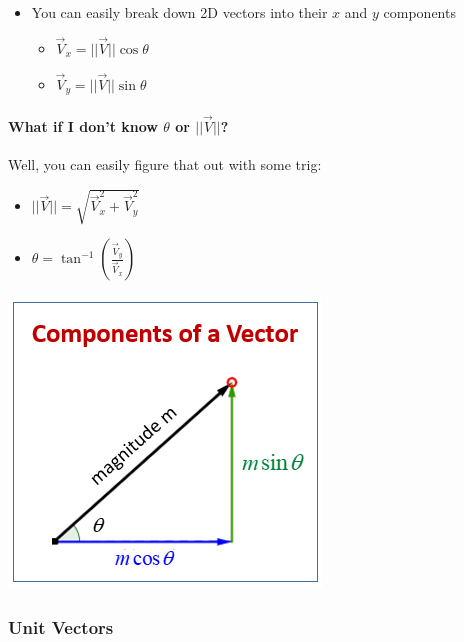 \documentclass[
  letterpaper,
  DIV=11,
  numbers=noendperiod]{scrartcl}
\let\oldparagraph\paragraph
\renewcommand{\paragraph}[1]{\oldparagraph{#1}\mbox{}}
\providecommand{\tightlist}{%
  \setlength{\itemsep}{0pt}\setlength{\parskip}{0pt}}\usepackage{longtable,booktabs,array}
\begin{document}
\begin{itemize}
\tightlist
\item
  You can easily break down 2D vectors into their \(x\) and \(y\)
  components

  \begin{itemize}
  \tightlist
  \item
    \(\vec{V}_x = ||\vec{V}||\cos\theta\)
  \item
    \(\vec{V}_y = ||\vec{V}||\sin\theta\)
  \end{itemize}
\end{itemize}

\hypertarget{what-if-i-dont-know-theta-or-vecv}{%
\paragraph{\texorpdfstring{What if I don't know \(\theta\) or
\(||\vec{V}||\)?}{What if I don't know \textbackslash theta or \textbar\textbar\textbackslash vec\{V\}\textbar\textbar?}}\label{what-if-i-dont-know-theta-or-vecv}}

Well, you can easily figure that out with some trig:

\begin{itemize}
\tightlist
\item
  \(||\vec{V}|| = \sqrt{\vec{V}_x^2 + \vec{V}_y^2}\)
\item
  \(\theta = \tan^{-1}\left(\frac{\vec{V}_y}{\vec{V}_x}\right)\)
\end{itemize}

\includegraphics{img/components-vector.png}

\hypertarget{unit-vectors}{%
\subsubsection{Unit Vectors}\label{unit-vectors}}
\end{document}
